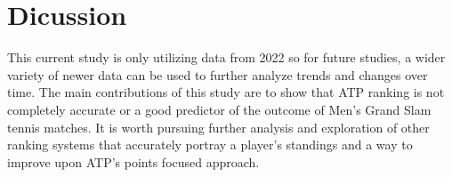 \documentclass[12pt]{article}
\begin{document}
\section{Dicussion}
\label{sec:discussion}

This current study is only utilizing data from 2022 so for future studies, 
a wider variety of newer data can be used to further analyze trends and changes over time.
The main contributions of this study are to show that ATP ranking is not completely accurate 
or a good predictor of the outcome of Men's Grand Slam tennis matches. It is worth pursuing 
further analysis and exploration of other ranking systems that accurately portray a player's 
standings and a way to improve upon ATP's points focused approach.





\end{document}
